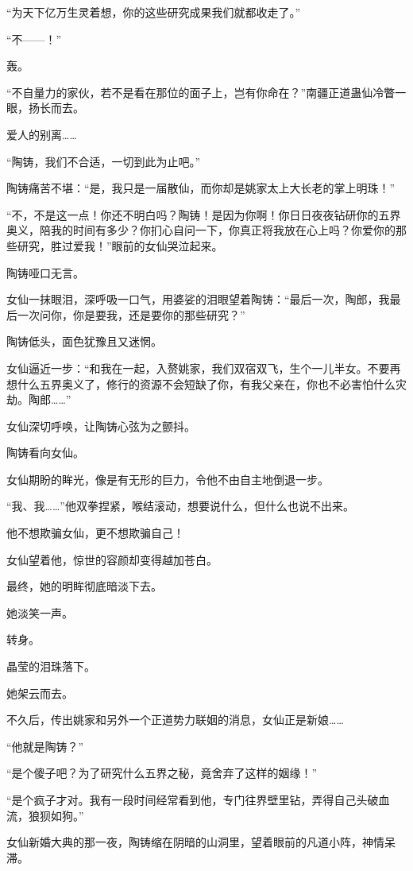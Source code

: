 \begin{this_body}
“为天下亿万生灵着想，你的这些研究成果我们就都收走了。”

“不——！”

轰。

“不自量力的家伙，若不是看在那位的面子上，岂有你命在？”南疆正道蛊仙冷瞥一眼，扬长而去。

爱人的别离……

“陶铸，我们不合适，一切到此为止吧。”

陶铸痛苦不堪：“是，我只是一届散仙，而你却是姚家太上大长老的掌上明珠！”

“不，不是这一点！你还不明白吗？陶铸！是因为你啊！你日日夜夜钻研你的五界奥义，陪我的时间有多少？你扪心自问一下，你真正将我放在心上吗？你爱你的那些研究，胜过爱我！”眼前的女仙哭泣起来。

陶铸哑口无言。

女仙一抹眼泪，深呼吸一口气，用婆娑的泪眼望着陶铸：“最后一次，陶郎，我最后一次问你，你是要我，还是要你的那些研究？”

陶铸低头，面色犹豫且又迷惘。

女仙逼近一步：“和我在一起，入赘姚家，我们双宿双飞，生个一儿半女。不要再想什么五界奥义了，修行的资源不会短缺了你，有我父亲在，你也不必害怕什么灾劫。陶郎……”

女仙深切呼唤，让陶铸心弦为之颤抖。

陶铸看向女仙。

女仙期盼的眸光，像是有无形的巨力，令他不由自主地倒退一步。

“我、我……”他双拳捏紧，喉结滚动，想要说什么，但什么也说不出来。

他不想欺骗女仙，更不想欺骗自己！

女仙望着他，惊世的容颜却变得越加苍白。

最终，她的明眸彻底暗淡下去。

她淡笑一声。

转身。

晶莹的泪珠落下。

她架云而去。

不久后，传出姚家和另外一个正道势力联姻的消息，女仙正是新娘……

“他就是陶铸？”

“是个傻子吧？为了研究什么五界之秘，竟舍弃了这样的姻缘！”

“是个疯子才对。我有一段时间经常看到他，专门往界壁里钻，弄得自己头破血流，狼狈如狗。”

女仙新婚大典的那一夜，陶铸缩在阴暗的山洞里，望着眼前的凡道小阵，神情呆滞。


\end{this_body}
